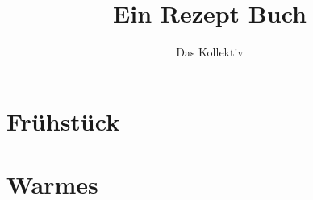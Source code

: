 \documentclass[a4paper, 11pt]{article}
\begin{document}
    \title{Ein Rezept Buch}
    \author{Das Kollektiv}
    \maketitle
    \tableofcontents

    \vspace{5em}

    \section{Frühstück}

    
    
    
    \section{Warmes}
    
    

    
    


\end{document}
